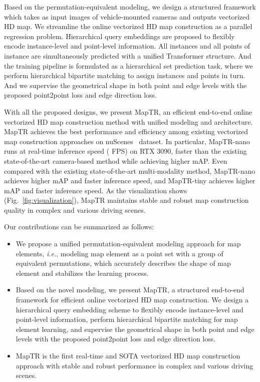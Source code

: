\documentclass{article} \usepackage{iclr2023_conference,times}
\def\ie{\emph{i.e.}} \def\Ie{\emph{I.e.}}
\begin{document}
Based on the permutation-equivalent modeling, we design a structured framework which takes as input images of vehicle-mounted cameras and outputs vectorized HD map.
We streamline the online vectorized HD map construction as a parallel regression problem.  
Hierarchical query embeddings are proposed to flexibly encode instance-level and point-level information. All instances and all points of instance are simultaneously predicted with a unified Transformer structure. And   the training pipeline is formulated as a hierarchical set prediction task, where we perform hierarchical bipartite matching to assign instances and points in turn. And we supervise the geometrical shape in both point and edge levels with the proposed point2point loss and edge direction loss.

With all the proposed designs, we present MapTR, an efficient end-to-end online vectorized HD map construction method with unified modeling and  architecture.
MapTR achieves the best performance and efficiency among existing vectorized map construction approaches on nuScenes~\citep{nuscenes} dataset. In particular, MapTR-nano runs at real-time inference speed ( FPS) on RTX 3090,  faster than the existing state-of-the-art camera-based method while achieving  higher mAP.
Even compared with the existing state-of-the-art multi-modality method, MapTR-nano achieves  higher mAP and  faster inference speed, and MapTR-tiny achieves  higher mAP and  faster inference speed.
As the visualization shows (Fig.~\ref{fig:visualization}), MapTR maintains stable and robust map construction quality in complex and various driving scenes.

Our contributions can be summarized as follows:
\begin{itemize}
    \item We propose a unified permutation-equivalent modeling approach for map elements, \ie, modeling map element as a point set with a group of equivalent permutations, which accurately describes the shape of map element and stabilizes the learning process.
\item  Based on the novel modeling, we present MapTR, a structured end-to-end framework for efficient online vectorized HD map construction.
    We design a hierarchical query embedding scheme to flexibly encode instance-level and point-level information, perform hierarchical bipartite matching for map element learning,  and supervise the geometrical shape in both point and edge levels with the proposed point2point loss and edge direction loss.
    \item  MapTR is the first real-time and SOTA vectorized HD map construction approach with stable and robust performance in complex and various driving scenes.
\end{itemize}
\end{document}
